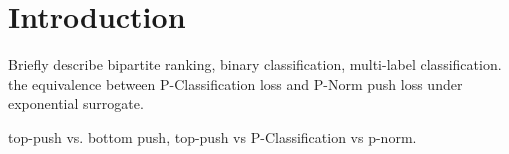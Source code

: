\section{Introduction}
\label{sec:intro}

{\it



Briefly describe bipartite ranking, binary classification, multi-label classification.
the equivalence between P-Classification loss and P-Norm push loss under exponential surrogate.

top-push vs. bottom push, top-push vs P-Classification vs p-norm.
}
